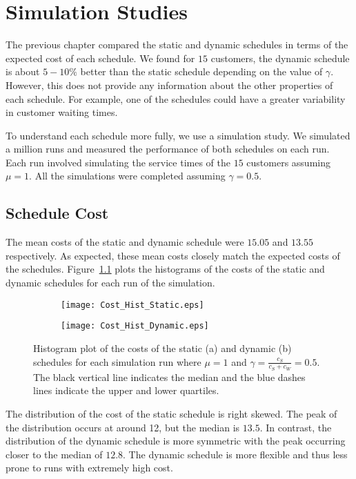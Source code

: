 \chapter{Simulation Studies}
\label{chap:Simulation}
The previous chapter compared the static and dynamic schedules in terms of the expected cost of each schedule. We found for $15$ customers, the dynamic schedule is about $5 - 10 \%$ better than the static schedule depending on the value of $\gamma$. However, this does not provide any information about the other properties of each schedule. For example, one of the schedules could have a greater variability in customer waiting times.

To understand each schedule more fully, we use a simulation study. We simulated a million runs and measured the performance of both schedules on each run. Each run involved simulating the service times of the $15$ customers assuming $\mu = 1$. All the simulations were completed assuming $\gamma = 0.5$.

\section{Schedule Cost}
The mean costs of the static and dynamic schedule were $15.05$ and $13.55$ respectively. As expected, these mean costs closely match the expected costs of the schedules. Figure~\ref{fig:Two_Cost} plots the histograms of the costs of the static and dynamic schedules for each run of the simulation.
\begin{figure}[htb]
	\centering
	\begin{subfigure}[t]{0.45\textwidth}
		\centering
		\texttt{[image: Cost\_Hist\_Static.eps]}
		\caption{}
	\end{subfigure}
	\begin{subfigure}[t]{0.45\textwidth}
		\centering
		\texttt{[image: Cost\_Hist\_Dynamic.eps]}
		\caption{}
	\end{subfigure}
	\caption{Histogram plot of the costs of the static (a) and dynamic (b) schedules for each simulation run where $\mu = 1$ and $\gamma = \frac{c_{S}}{c_{S} + c_{W}} = 0.5$. The black vertical line indicates the median and the blue dashes lines indicate the upper and lower quartiles.}
	\label{fig:Two_Cost}
\end{figure}

The distribution of the cost of the static schedule is right skewed. The peak of the distribution occurs at around 12, but the median is $13.5$. In contrast, the distribution of the dynamic schedule is more symmetric with the peak occurring closer to the median of $12.8$. The dynamic schedule is more flexible and thus less prone to runs with extremely high cost.

